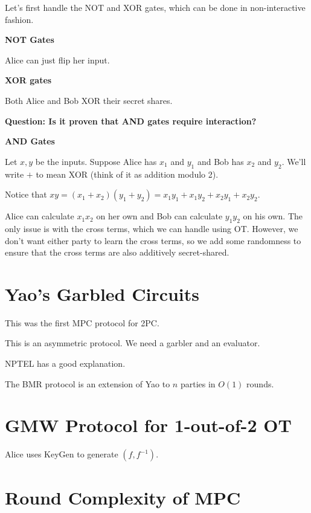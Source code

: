\documentclass{article}
\theoremstyle{definition}
\begin{document}
Let's first handle the NOT and XOR gates, which can be done in non-interactive fashion.

\textbf{NOT Gates}

Alice can just flip her input.

\textbf{XOR gates}

Both Alice and Bob XOR their secret shares.

\textbf{Question: Is it proven that AND gates require interaction?}

\textbf{AND Gates}

Let $x,y$ be the inputs. Suppose Alice has $x_{1}$ and $y_{1}$ and Bob has $x_{2}$ and $y_{2}$. We'll write $+$ to mean XOR (think of it as addition modulo 2).


Notice that $xy = (x_{1} + x_{2})(y_{1} + y_{2}) = x_{1}y_{1} + x_{1}y_{2} + x_{2}y_{1} + x_{2}y_{2}$.

Alice can calculate $x_{1}x_{2}$ on her own and Bob can calculate $y_{1}y_{2}$ on his own. The only issue is with the cross terms, which we can handle using OT. However, we don't want either party to learn the cross terms, so we add some randomness to ensure that the cross terms are also additively secret-shared.

\newpage

\section{Yao's Garbled Circuits}

This was the first MPC protocol for 2PC.

This is an asymmetric protocol. We need a garbler and an evaluator. 

NPTEL has a good explanation.

The BMR protocol is an extension of Yao to $n$ parties in $O(1)$ rounds.



\newpage

\section{GMW Protocol for 1-out-of-2 OT}

Alice uses KeyGen to generate $(f,f^{-1})$. 

\newpage

\section{Round Complexity of MPC}
\end{document}
